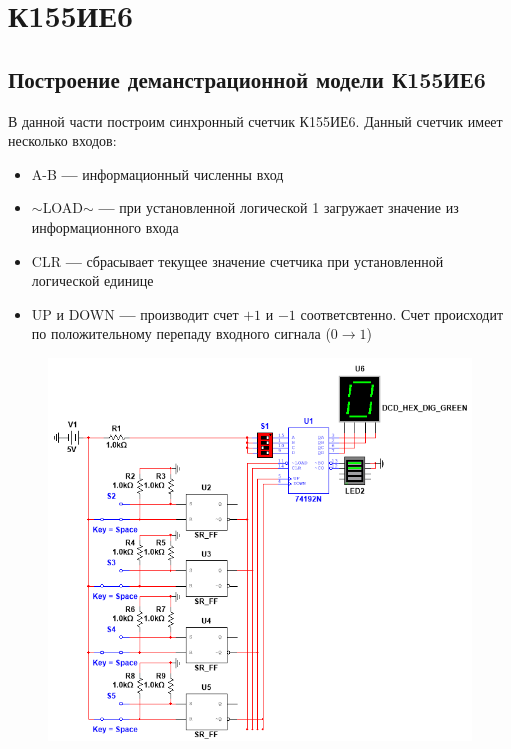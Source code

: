 \section*{К155ИЕ6}

\subsection*{Построение деманстрационной модели К155ИЕ6}

В данной части построим синхронный счетчик К155ИЕ6. Данный счетчик имеет несколько входов:

\begin{itemize}
    \item A-B \textbf{---} информационный численны вход
    \item $\sim$LOAD$\sim$ \textbf{---} при установленной логической 1 загружает значение из информационного входа
    \item CLR \textbf{---} сбрасывает текущее значение счетчика при установленной логической единице
    \item UP и DOWN \textbf{---} производит счет $+1$ и $-1$ соответсвтенно. Счет происходит по положительному перепаду входного сигнала ($0 \rightarrow 1$) 
\end{itemize}

\begin{figure}[h!]
    \centering
    \includegraphics[scale=0.8]{images/image-8.png}
    \label{image:8}
\end{figure}

